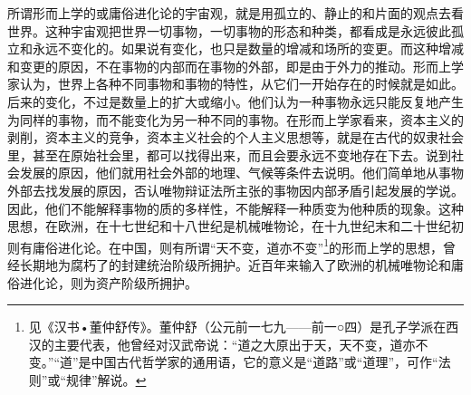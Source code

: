 \documentclass[UTF8, 12pt, a4paper]{ctexrep}
\begin{document}
所谓形而上学的或庸俗进化论的宇宙观，就是用孤立的、静止的和片面的观点去看世界。这种宇宙观把世界一切事物，一切事物的形态和种类，都看成是永远彼此孤立和永远不变化的。如果说有变化，也只是数量的增减和场所的变更。而这种增减和变更的原因，不在事物的内部而在事物的外部，即是由于外力的推动。形而上学家认为，世界上各种不同事物和事物的特性，从它们一开始存在的时候就是如此。后来的变化，不过是数量上的扩大或缩小。他们认为一种事物永远只能反复地产生为同样的事物，而不能变化为另一种不同的事物。在形而上学家看来，资本主义的剥削，资本主义的竞争，资本主义社会的个人主义思想等，就是在古代的奴隶社会里，甚至在原始社会里，都可以找得出来，而且会要永远不变地存在下去。说到社会发展的原因，他们就用社会外部的地理、气候等条件去说明。他们简单地从事物外部去找发展的原因，否认唯物辩证法所主张的事物因内部矛盾引起发展的学说。因此，他们不能解释事物的质的多样性，不能解释一种质变为他种质的现象。这种思想，在欧洲，在十七世纪和十八世纪是机械唯物论，在十九世纪末和二十世纪初则有庸俗进化论。在中国，则有所谓“天不变，道亦不变”\footnote{见《汉书•董仲舒传》。董仲舒（公元前一七九——前一○四）是孔子学派在西汉的主要代表，他曾经对汉武帝说：“道之大原出于天，天不变，道亦不变。”“道”是中国古代哲学家的通用语，它的意义是“道路”或“道理”，可作“法则”或“规律”解说。}的形而上学的思想，曾经长期地为腐朽了的封建统治阶级所拥护。近百年来输入了欧洲的机械唯物论和庸俗进化论，则为资产阶级所拥护。
\end{document}
